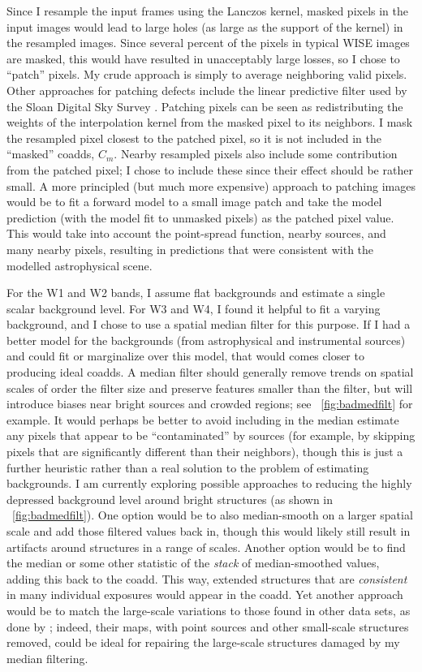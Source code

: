 \documentclass[11pt,preprint]{aastex}
\newcommand{\figref}[1]{\figurename~\ref{#1}}
\newcommand{\fimg}[1]{#1}
\newcommand{\coadd}{\fimg{C}}
\begin{document}
Since I resample the input frames using the Lanczos kernel, masked
pixels in the input images would lead to large holes (as large as the
support of the kernel) in the resampled images.  Since several percent
of the pixels in typical WISE images are masked, this would have
resulted in unacceptably large losses, so I chose to ``patch''
pixels.  My crude approach is simply to average neighboring valid
pixels.  Other approaches for patching defects include the linear
predictive filter used by the Sloan Digital Sky Survey
\citep{sdss-edr}.  Patching pixels can be seen as redistributing the
weights of the interpolation kernel from the masked pixel to its neighbors.
I mask the resampled pixel closest to the patched pixel, so it is not
included in the ``masked'' coadds, $\coadd_m$.  Nearby resampled
pixels also include some contribution from the patched pixel; I chose
to include these since their effect should be rather small.
%
A more principled (but much more expensive) approach to patching
images would be to fit a forward model to a small image patch and take
the model prediction (with the model fit to unmasked pixels) as the
patched pixel value.  This would take into account the point-spread
function, nearby sources, and many nearby pixels, resulting in
predictions that were consistent with the modelled astrophysical
scene.


For the W1 and W2 bands, I assume flat backgrounds and estimate a
single scalar background level.  For W3 and W4, I found it helpful to
fit a varying background, and I chose to use a spatial median filter
for this purpose.  If I had a better model for the backgrounds (from
astrophysical and instrumental sources) and could fit or marginalize
over this model, that would comes closer to producing ideal coadds.  A
median filter should generally remove trends on spatial scales of
order the filter size and preserve features smaller than the filter,
but will introduce biases near bright sources and crowded
regions; see \figref{fig:badmedfilt} for example.  It would perhaps be
better to avoid including in the median estimate any pixels that
appear to be ``contaminated'' by sources (for example, by skipping
pixels that are significantly different than their neighbors), though
this is just a further heuristic rather than a real solution to the
problem of estimating backgrounds.  I am currently exploring possible
approaches to reducing the highly depressed background level around
bright structures (as shown in \figref{fig:badmedfilt}).  One option
would be to also median-smooth on a larger spatial scale and add those
filtered values back in, though this would likely still result in
artifacts around structures in a range of scales.  Another option
would be to find the median or some other statistic of the
\emph{stack} of median-smoothed values, adding this back to the coadd.
This way, extended structures that are \emph{consistent} in many
individual exposures would appear in the coadd.  Yet another approach
would be to match the large-scale variations to those found in other
data sets, as done by \cite{meisner}; indeed, their maps, with point
sources and other small-scale structures removed, could be ideal for
repairing the large-scale structures damaged by my median filtering.
\end{document}
